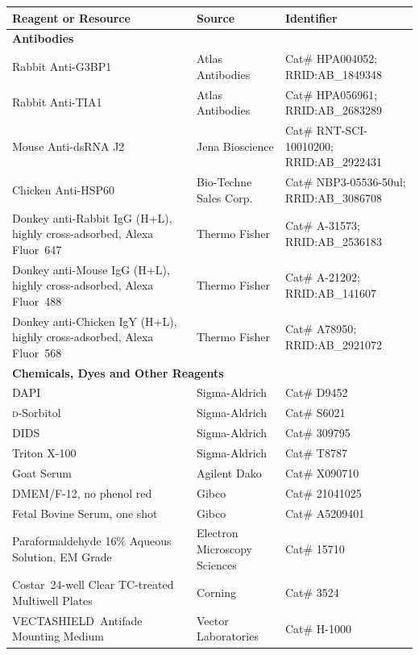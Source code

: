 \begin{table}[H]
	\begin{tabular}{|p{0.50\resourcetablewidth}|p{0.25\resourcetablewidth}|p{0.25\resourcetablewidth}|}
		\hline
		\textbf{Reagent or Resource} & \textbf{Source} & \textbf{Identifier} \\
		\hline
		\multicolumn{3}{|l|}{\textbf{Antibodies}} \\
		\hline
		Rabbit Anti-G3BP1 & Atlas Antibodies & Cat\# HPA004052; RRID:AB\_1849348 \\
		\hline
		Rabbit Anti-TIA1 & Atlas Antibodies & Cat\# HPA056961; RRID:AB\_2683289 \\
		\hline
		Mouse Anti-dsRNA J2 & Jena Bioscience & Cat\# RNT-SCI-10010200; RRID:AB\_2922431 \\
		\hline
		Chicken Anti-HSP60 & Bio-Techne Sales Corp. & Cat\# NBP3-05536-50ul; RRID:AB\_3086708 \\
		\hline
		Donkey anti-Rabbit IgG (H+L), highly cross-adsorbed, Alexa Fluor\texttrademark~647 & Thermo Fisher & Cat\# A-31573; RRID:AB\_2536183 \\
		\hline
		Donkey anti-Mouse IgG (H+L), highly cross-adsorbed, Alexa Fluor\texttrademark~488 & Thermo Fisher & Cat\# A-21202; RRID:AB\_141607 \\
		\hline
		Donkey anti-Chicken IgY (H+L), highly cross-adsorbed, Alexa Fluor\texttrademark~568 & Thermo Fisher & Cat\# A78950; RRID:AB\_2921072 \\
		\hline
		\multicolumn{3}{|l|}{\textbf{Chemicals, Dyes and Other Reagents}} \\
		\hline
		DAPI & Sigma-Aldrich & Cat\# D9452 \\
		\hline
		\textsc{d}-Sorbitol & Sigma-Aldrich & Cat\# S6021 \\
		\hline
		DIDS & Sigma-Aldrich & Cat\# 309795 \\
		\hline
		Triton X-100 & Sigma-Aldrich & Cat\# T8787 \\
		\hline
		Goat Serum & Agilent Dako & Cat\# X090710 \\
		\hline
		DMEM/F-12, no phenol red & Gibco & Cat\# 21041025 \\
		\hline
		Fetal Bovine Serum, one shot & Gibco & Cat\# A5209401 \\
		\hline
		Paraformaldehyde 16\% Aqueous Solution, EM Grade & Electron Microscopy Sciences & Cat\# 15710 \\
		\hline
		Costar\textregistered~24-well Clear TC-treated Multiwell Plates & Corning & Cat\# 3524 \\
		\hline
		VECTASHIELD\textregistered~Antifade Mounting Medium & Vector Laboratories & Cat\# H-1000 \\

\end{tabular}
\end{table}
